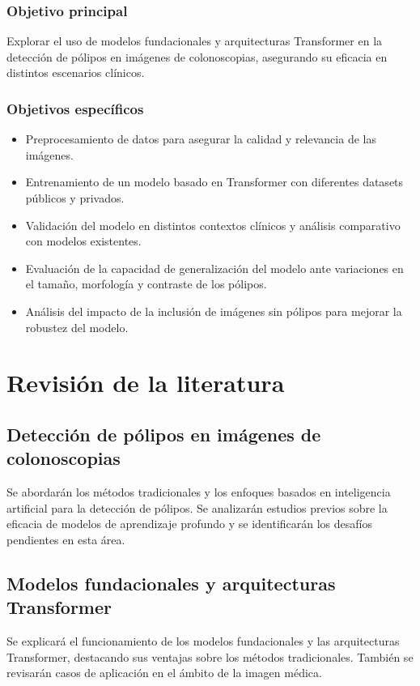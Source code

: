 \documentclass[a4paper,12pt]{report}
\begin{document}
\subsection{Objetivo principal}
Explorar el uso de modelos fundacionales y arquitecturas Transformer en la detección de pólipos en imágenes de colonoscopias, asegurando su eficacia en distintos escenarios clínicos.

\subsection{Objetivos específicos}
\begin{itemize}
    \item Preprocesamiento de datos para asegurar la calidad y relevancia de las imágenes.
    \item Entrenamiento de un modelo basado en Transformer con diferentes datasets públicos y privados.
    \item Validación del modelo en distintos contextos clínicos y análisis comparativo con modelos existentes.
    \item Evaluación de la capacidad de generalización del modelo ante variaciones en el tamaño, morfología y contraste de los pólipos.
    \item Análisis del impacto de la inclusión de imágenes sin pólipos para mejorar la robustez del modelo.
\end{itemize}

\chapter{Revisión de la literatura}
\section{Detección de pólipos en imágenes de colonoscopias}
Se abordarán los métodos tradicionales y los enfoques basados en inteligencia artificial para la detección de pólipos. Se analizarán estudios previos sobre la eficacia de modelos de aprendizaje profundo y se identificarán los desafíos pendientes en esta área.

\section{Modelos fundacionales y arquitecturas Transformer}
Se explicará el funcionamiento de los modelos fundacionales y las arquitecturas Transformer, destacando sus ventajas sobre los métodos tradicionales. También se revisarán casos de aplicación en el ámbito de la imagen médica.
\end{document}
